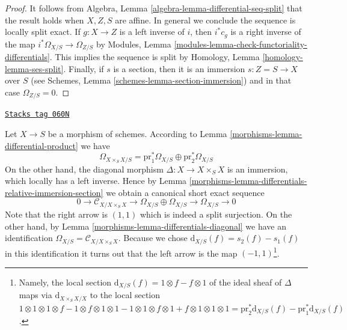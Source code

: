\begin{proof}
It follows from Algebra, Lemma \ref{algebra-lemma-differential-seq-split}
that the result holds when $X, Z, S$ are affine. In general we conclude
the sequence is locally split exact. If $g : X \to Z$ is a left inverse
of $i$, then $i^*c_g$ is a right inverse of the map
$i^*\Omega_{X/S} \to \Omega_{Z/S}$ by
Modules, Lemma \ref{modules-lemma-check-functoriality-differentials}.
This implies the sequence is split by
Homology, Lemma \ref{homology-lemma-ses-split}.
Finally, if $s$ is a section, then it is an immersion $s : Z = S \to X$
over $S$ (see Schemes, Lemma \ref{schemes-lemma-section-immersion})
and in that case $\Omega_{Z/S} = 0$.
\end{proof}

\begin{remark}
\label{morphisms-remark-differentials-diagonal}
\href{https://stacks.math.columbia.edu/tag/060N}{\texttt{Stacks tag 060N}}

Let $X \to S$ be a morphism of schemes. According to
Lemma \ref{morphisms-lemma-differential-product}
we have
$$
\Omega_{X \times_S X/S} =
\text{pr}_1^*\Omega_{X/S} \oplus \text{pr}_2^*\Omega_{X/S}
$$
On the other hand, the diagonal morphism $\Delta : X \to X \times_S X$
is an immersion, which locally has a left inverse. Hence by
Lemma \ref{morphisms-lemma-differentials-relative-immersion-section}
we obtain a canonical short exact sequence
$$
0 \to \mathcal{C}_{X/X \times_S X} \to \Omega_{X/S} \oplus \Omega_{X/S}
\to \Omega_{X/S} \to 0
$$
Note that the right arrow is $(1, 1)$ which is indeed a split surjection.
On the other hand, by Lemma \ref{morphisms-lemma-differentials-diagonal}
we have an identification $\Omega_{X/S} = \mathcal{C}_{X/X \times_S X}$.
Because we chose $\text{d}_{X/S}(f) = s_2(f) - s_1(f)$ in this
identification it turns out that the left arrow is the map
$(-1, 1)$\footnote{Namely,
the local section $\text{d}_{X/S}(f) = 1 \otimes f - f \otimes 1$ of the
ideal sheaf of $\Delta$ maps via $\text{d}_{X \times_S X/X}$ to the
local section
$1 \otimes 1 \otimes 1 \otimes f - 1 \otimes f \otimes 1 \otimes 1
-1 \otimes 1 \otimes f \otimes 1 + f \otimes 1 \otimes 1 \otimes 1 =
\text{pr}_2^*\text{d}_{X/S}(f) - \text{pr}_1^*\text{d}_{X/S}(f)$.}.
\end{remark}


